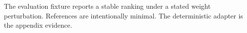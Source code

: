 \documentclass[a4paper]{article}
\begin{document}
\label{mm:body-start}The evaluation fixture reports a stable ranking under a stated weight perturbation.\label{mm:body-end}
\clearpage\label{mm:references-start}References are intentionally minimal.\label{mm:references-end}
\clearpage\label{mm:appendix-start}The deterministic adapter is the appendix evidence.\label{mm:appendix-end}
\end{document}
